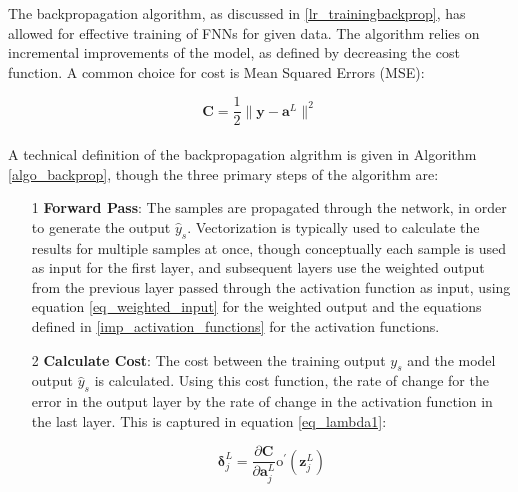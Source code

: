 \documentclass[a4paper,11pt,oneside]{article}
\theoremstyle{plain}
\theoremstyle{definition}
\begin{document}
	The backpropagation algorithm, as discussed in \ref{lr_trainingbackprop}, has allowed for effective training of FNNs for given data. The algorithm relies on incremental improvements of the model, as defined by decreasing the cost function. A common choice for cost is Mean Squared Errors (MSE):
	
	\begin{equation}\label{func_MSE}
	\mathbf{C} = \frac{1}{2} \rVert \mathbf{y} - \mathbf{a}^L \rVert^2
	\end{equation}
	~\\
	
	A technical definition of the backpropagation algrithm is given in Algorithm \ref{algo_backprop}, though the three primary steps of the algorithm are:\newline
	\begin{itemize}
		\item [1] \textbf{Forward Pass}: The samples are propagated through the network, in order to generate the output $\hat{y}_s$. Vectorization is typically used to calculate the results for multiple samples at once, though conceptually each sample is used as input for the first layer, and subsequent layers use the weighted output from the previous layer passed through the activation function as input, using equation \eqref{eq_weighted_input} for the weighted output and the equations defined in \ref{imp_activation_functions} for the activation functions.
		\newline
		\item [2] \textbf{Calculate Cost}: The cost between the training output $y_s$ and the model output $\hat{y}_s$ is calculated. Using this cost function, the rate of change for the error in the output layer by the rate of change in the activation function in the last layer. This is captured in equation \eqref{eq_lambda1}:	
		
		\begin{equation}\label{eq_lambda1}
		\mathbf{\delta}_{j}^{L}=\frac{\partial \mathbf{C}}{\partial \mathbf{a}_{j}^{L}} \mathrm{o}^{\prime}\left(\mathbf{z}_{j}^{L}\right)
		\end{equation}
		

\end{itemize}
\end{document}
